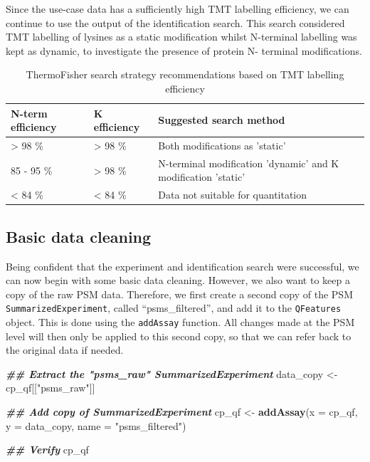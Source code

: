 \documentclass[9pt,a4paper,]{extarticle}
\newenvironment{Shaded}{\begin{snugshade}}{\end{snugshade}}
\newcommand{\AttributeTok}[1]{\textcolor[rgb]{0.13,0.29,0.53}{#1}}
\newcommand{\DocumentationTok}[1]{\textcolor[rgb]{0.56,0.35,0.01}{\textbf{\textit{#1}}}}
\newcommand{\FunctionTok}[1]{\textcolor[rgb]{0.13,0.29,0.53}{\textbf{#1}}}
\newcommand{\NormalTok}[1]{#1}
\newcommand{\OtherTok}[1]{\textcolor[rgb]{0.56,0.35,0.01}{#1}}
\newcommand{\StringTok}[1]{\textcolor[rgb]{0.31,0.60,0.02}{#1}}
\begin{document}
Since the use-case data has a sufficiently high TMT labelling efficiency, we
can continue to use the output of the identification search. This search
considered TMT labelling of lysines as a static modification whilst N-terminal
labelling was kept as dynamic, to investigate the presence of protein N-
terminal modifications.

\begin{table}

\caption{\label{tab:table2}ThermoFisher search strategy recommendations based on TMT labelling efficiency}
\centering
\begin{tabular}[t]{l|l|l}
\hline
N-term efficiency & K efficiency & Suggested search method\\
\hline
> 98 \% & > 98 \% & Both modifications as 'static'\\
\hline
85 - 95 \% & > 98 \% & N-terminal modification 'dynamic' and K modification 'static'\\
\hline
< 84 \% & < 84 \% & Data not suitable for quantitation\\
\hline
\end{tabular}
\end{table}

\hypertarget{basic-data-cleaning}{%
\subsection{Basic data cleaning}\label{basic-data-cleaning}}

Being confident that the experiment and identification search were successful,
we can now begin with some basic data cleaning. However, we also want to keep a
copy of the raw PSM data. Therefore, we first create a second copy of the PSM
\texttt{SummarizedExperiment}, called ``psms\_filtered'', and add it to the \texttt{QFeatures}
object. This is done using the \texttt{addAssay} function. All changes made at the PSM
level will then only be applied to this second copy, so that we can refer back
to the original data if needed.

\begin{Shaded}
\begin{Highlighting}[]
\DocumentationTok{\#\# Extract the "psms\_raw" SummarizedExperiment}
\NormalTok{data\_copy }\OtherTok{\textless{}{-}}\NormalTok{ cp\_qf[[}\StringTok{"psms\_raw"}\NormalTok{]]}

\DocumentationTok{\#\# Add copy of SummarizedExperiment}
\NormalTok{cp\_qf }\OtherTok{\textless{}{-}} \FunctionTok{addAssay}\NormalTok{(}\AttributeTok{x =}\NormalTok{ cp\_qf, }
                  \AttributeTok{y =}\NormalTok{ data\_copy,}
                  \AttributeTok{name =} \StringTok{"psms\_filtered"}\NormalTok{)}

\DocumentationTok{\#\# Verify}
\NormalTok{cp\_qf}
\end{Highlighting}
\end{Shaded}
\end{document}

